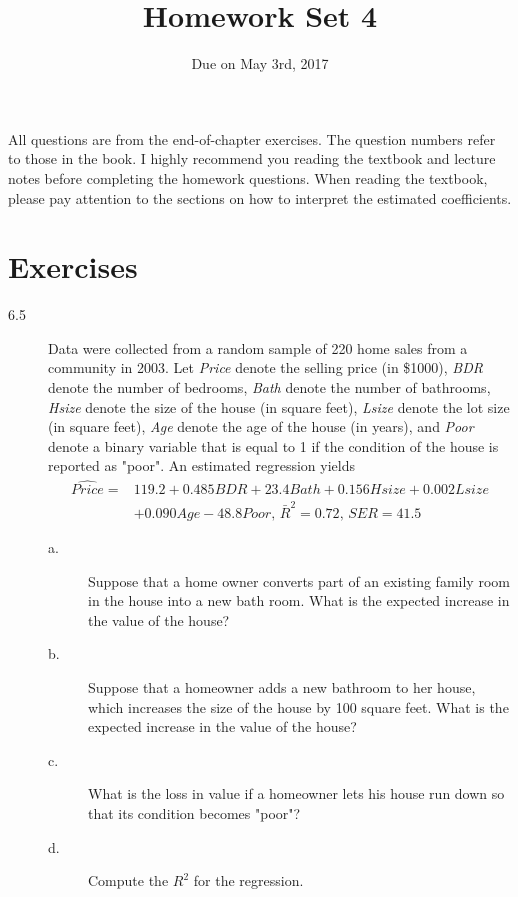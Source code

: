 \documentclass[a4paper,11pt]{article}
\date{Due on May 3rd, 2017}
\title{Homework Set 4}
\begin{document}
\maketitle
All questions are from the end-of-chapter exercises. The question
numbers refer to those in the book. I highly recommend you reading the
textbook and lecture notes before completing the homework
questions. When reading the textbook, please pay attention to the
sections on how to interpret the estimated coefficients.

\section*{Exercises}
\label{sec:orgc818fa3}
\begin{description}
\item[{6.5}] Data were collected from a random sample of 220 home sales
from a community in 2003. Let \emph{Price} denote the selling
price (in \$1000), \emph{BDR} denote the number of bedrooms, \emph{Bath}
denote the number of bathrooms, \emph{Hsize} denote the size of
the house (in square feet), \emph{Lsize} denote the lot size (in
square feet), \emph{Age} denote the age of the house (in years),
and \emph{Poor} denote a binary variable that is equal to 1 if the
condition of the house is reported as "poor". An estimated
regression yields
\begin{equation*}
\begin{split}
\widehat{Price} =& 119.2 + 0.485 BDR + 23.4 Bath + 0.156
Hsize + 0.002 Lsize \\
&+ 0.090 Age - 48.8 Poor,\, \bar{R}^2 = 0.72,\,
SER = 41.5
\end{split}
\end{equation*}
\begin{description}
\item[{a.}] Suppose that a home owner converts part of an existing family
room in the house into a new bath room. What is the expected
increase in the value of the house?
\item[{b.}] Suppose that a homeowner adds a new bathroom to her house,
which increases the size of the house by 100 square
feet. What is the expected increase in the value of the house?
\item[{c.}] What is the loss in value if a homeowner lets his house run
down so that its condition becomes "poor"?
\item[{d.}] Compute the \(R^2\) for the regression.
\end{description}


\end{description}
\end{document}

